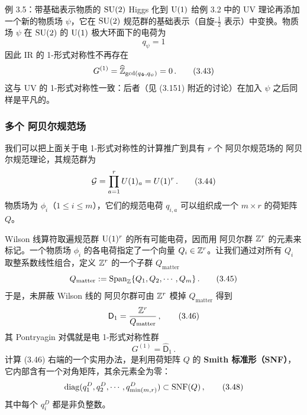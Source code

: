 \begin{examplebox}{例 3.5：带基础表示物质的 $\mathrm{SU}(2)$ Higgs 化到 $\mathrm{U}(1)$}
给例 3.2 中的 UV 理论再添加一个新的物质场 $\psi$，它在 $\mathrm{SU}(2)$ 规范群的基础表示（自旋-$\frac{1}{2}$ 表示）中变换。物质场 $\psi$ 在 $\mathrm{SU}(2)$ 的 $\mathrm{U}(1)$ 极大环面下的电荷为
\begin{equation}
  q_\psi=1 \tag{3.42}
\end{equation}
因此 IR 的 1-形式对称性不再存在
\begin{equation}
  G^{(1)}=\widehat{\mathbb{Z}}_{\gcd(q_\Phi,q_\psi)}=0\,. \tag{3.43}
\end{equation}
这与 UV 的 1-形式对称性一致：后者（见 (3.151) 附近的讨论）在加入 $\psi$ 之后同样是平凡的。
\end{examplebox}


\subsubsection{多个 阿贝尔规范场}

我们可以把上面关于电 1-形式对称性的计算推广到具有 $r$ 个 阿贝尔规范场的 阿贝尔规范理论，其规范群为
\begin{equation}
  \mathcal{G}=\prod_{a=1}^{r}U(1)_a=U(1)^r\,. \tag{3.44}
\end{equation}
物质场为 $\phi_i$（$1\le i\le m$），它们的规范电荷 $q_{i,a}$ 可以组织成一个 $m\times r$ 的荷矩阵 $Q$。

Wilson 线算符取遍规范群 $\mathrm{U}(1)^r$ 的所有可能电荷，因而用 阿贝尔群 $\mathbb{Z}^r$ 的元素来标记。一个物质场 $\phi_i$ 的各电荷指定了一个向量 $Q_i\in\mathbb{Z}^r$。让我们通过对所有 $Q_i$ 取整系数线性组合，定义 $\mathbb{Z}^r$ 的一个子群 $Q_{\mathrm{matter}}$
\begin{equation}
  Q_{\mathrm{matter}}:=\mathrm{Span}_{\mathbb{Z}}\{Q_1,Q_2,\cdots,Q_m\}\,. \tag{3.45}
\end{equation}
于是，未屏蔽 Wilson 线的 阿贝尔群可由 $\mathbb{Z}^r$ 模掉 $Q_{\mathrm{matter}}$ 得到
\begin{equation}
  \mathsf{D}_1=\frac{\mathbb{Z}^r}{Q_{\mathrm{matter}}}\,, \tag{3.46}
\end{equation}
其 Pontryagin 对偶就是电 1-形式对称性群
\begin{equation}
  G^{(1)}=\widehat{\mathsf{D}}_1\,. \tag{3.47}
\end{equation}
计算 (3.46) 右端的一个实用办法，是利用荷矩阵 $Q$ 的 \textbf{Smith 标准形（SNF）}，它内部含有一个对角矩阵，其余元素全为零：
\begin{equation}
  \operatorname{diag}(q_1^D,q_2^D,\cdots,q_{\min(m,r)}^D)\subset \mathrm{SNF}(Q)\,, \tag{3.48}
\end{equation}
其中每个 $q_i^D$ 都是非负整数。


